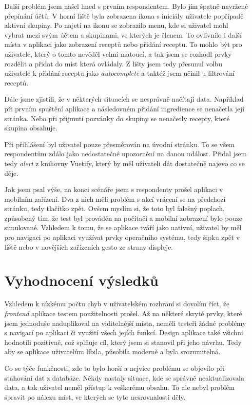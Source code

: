 Další problém jsem našel hned s prvním respondentem. Bylo jím špatně navržené přepínání účtů. V horní liště byla zobrazena ikona s iniciály uživatele
popřípadě aktivní skupiny. Po najetí na ikonu se zobrazilo menu, kde si uživatel mohl vybrat mezi svým účtem a skupinami, ve kterých je členem. To
ovlivnilo i další místa v aplikaci jako zobrazení receptů nebo přidání receptu. To mohlo být pro uživatele, který o tomto nevěděl velmi matoucí, a
tak jsem se rozhodl prvky rozdělit a přidat do míst která ovládaly. Z lišty jsem tedy přesunul volbu uživatele k přidání receptu jako \emph{autocomplete}
a taktéž jsem učinil u filtrování receptů.

Dále jsme zjistili, že v některých situacích se nesprávně načítají data. Například při prvním spuštění aplikace a následovném přidání ingredience
se nenačetla její stránka. Nebo při přijmutí pozvánky do skupiny se nenačetly recepty, které skupina obsahuje.

Při přihlášení byl uživatel pouze přesměrován na úvodní stránku. To se všem respondentům zdálo jako nedostatečné upozornění na danou událost.
Přidal jsem tedy \emph{alert} z knihovny Vuetify, který by měl uživateli dát dostatečně najevo co se děje.

Jak jsem psal výše, na konci scénáře jsem s respondenty prošel aplikaci v mobilním zařízení. Dva z nich měli problém s akcí vrácení se na předchozí stránku,
tedy tlačítko zpět. Ovšem myslím si, že toto byl falešný poplach, způsobený tím, že test byl prováděn na počítači a mobilní zobrazení bylo pouze simulované.
Vzhledem k tomu, že se aplikace tváří jako nativní, uživatel by měl pro navigaci po aplikaci využívat prvky operačního systému, tedy šipku zpět v liště nebo
v novějších zařízeních gesto ze strany displeje.

\section{Vyhodnocení výsledků}

Vzhledem k nízkému počtu chyb v uživatelském rozhraní si dovolím říct, že \emph{frontend} aplikace testem použitelnosti prošel. Až na některé
skryté prvky, které jsem jednoduše naduplikoval na viditelnější místa, neměli testeři žádné problémy s navigací po aplikaci či využití
všech jejích funkcí. Design aplikace také všichni hodnotili pozitivně, což splňuje cíl, který jsem si stanovil při jeho návrhu. Tedy aby
se aplikace uživatelům líbila, působila moderně a byla srozumitelná.

Co se týče funkčnosti, zde to bylo horší a nejvíce problému se objevilo při stahování dat z databáze. Někdy nastaly situace, kde se správně
neaktualizovala data, a tak uživatel neměl přístup k veškerému obsahu. To ale nebyl problém spravit po nálezu míst, ve kterých se tyto nesrovnalosti
děly.
